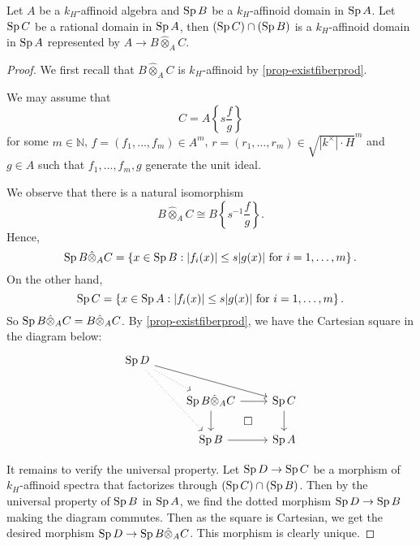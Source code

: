 \begin{lemma}\label{lma-affinoiddomainrestrtorationaldomain}
    Let $A$ be a $k_H$-affinoid algebra and $\operatorname{Sp} B$ be a $k_H$-affinoid domain in $\operatorname{Sp} A$. Let $\operatorname{Sp} C$ be a rational domain in $\operatorname{Sp} A$, then $(\operatorname{Sp} C)\cap (\operatorname{Sp} B)$ is a $k_H$-affinoid domain in $\operatorname{Sp} A$ represented by $A\rightarrow B\hat{\otimes}_A C$.
\end{lemma}
\begin{proof}
    We first recall that $B\hat{\otimes}_A C$ is $k_H$-affinoid by \cref{prop-existfiberprod}.

    We may assume that 
    \[
        C=A\left\{s\frac{f}{g}\right\}
    \]
    for some $m\in \mathbb{N}$, $f=(f_1,\ldots,f_m)\in A^m$, $r=(r_1,\ldots,r_m)\in \sqrt{|k^{\times}|\cdot H}^m$ and $g\in A$ such that $f_1,\ldots,f_m,g$ generate the unit ideal.

    We observe that there is a natural isomorphism
    \[
        B\hat{\otimes}_A C  \cong B\left\{s^{-1}\frac{f}{g}\right\}.
    \]
    Hence,
    \[
        \operatorname{Sp}  B\hat{\otimes}_A C=\left\{x\in \operatorname{Sp} B: |f_i(x)|\leq s|g(x)|\text{ for }i=1,\ldots,m\right\}.
    \]
    On the other hand,
    \[
        \operatorname{Sp} C=  \left\{x\in \operatorname{Sp} A: |f_i(x)|\leq s|g(x)|\text{ for }i=1,\ldots,m\right\}.
    \]
    So $\operatorname{Sp} B\hat{\otimes}_A C=B\hat{\otimes}_A C$. 
    By \cref{prop-existfiberprod}, we have the Cartesian square in the diagram below:
    \[
        \begin{tikzcd}
            \Sp D \arrow[rrd] \arrow[rdd, dotted] \arrow[rd, dotted] &                                                                           &                 \\
                                                                     & \Sp B\hat{\otimes}_A C \arrow[r] \arrow[d] \arrow[rd, "\square", phantom] & \Sp C \arrow[d] \\
                                                                     & \Sp B \arrow[r]                                                           & \Sp A          
            \end{tikzcd}
    \]
    
    It remains to verify the universal property.  Let $\operatorname{Sp} D\rightarrow \operatorname{Sp} C$ be a morphism of $k_H$-affinoid spectra that factorizes through $(\operatorname{Sp} C)\cap (\operatorname{Sp} B)$. Then by the universal property of $\operatorname{Sp} B$ in $\operatorname{Sp} A$, we find the dotted morphism $\operatorname{Sp} D\rightarrow \operatorname{Sp} B$ making the diagram commutes. Then as the square is Cartesian, we get the desired morphism $\operatorname{Sp} D\rightarrow \operatorname{Sp} B\hat{\otimes}_A C$. This morphism is clearly unique.
\end{proof}

